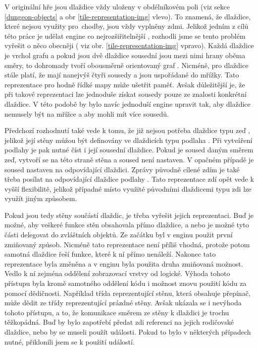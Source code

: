 V originální hře jsou dlaždice vždy uloženy v obdélníkovém poli (viz sekce \ref{dungeon-objects} a obr \ref{tile-representation-img} vlevo).
To znamená, že dlaždice, které nejsou využity pro~chodby, jsou vždy vyplněny zdmi. Jelikož jedním z cílů této práce je udělat engine co 
nejrozšiřitelnější , rozhodli jsme se tento problém vyřešit o něco obecněji ( viz obr. \ref{tile-representation-img} vpravo).
Každá dlaždice je vrchol grafu a pokud 
jsou dvě dlaždice sousední jsou mezi nimi hrany oběma směry, to dohromady tvoří obousměrně orientovaný graf .
Nicméně, pro dlaždice stále platí, že mají nanejvýš čtyři sousedy a jsou uspořádané do mřížky. Tato reprezentace pro hodně řídké mapy může ušetřit paměť.
Avšak důležitější je, že při takové reprezentaci lze jednoduše získat sousedy pouze ze znalosti konkrétní dlaždice. V této 
podobě by bylo navíc jednoduší engine upravit tak, aby dlaždice nemusely být na mřížce a aby mohli mít více sousedů.


Předchozí rozhodnutí také vede k tomu, že již nejsou potřeba dlaždice typu zeď , jelikož její stěny můžou být definovány ve 
dlaždicích typu podlaha . Při vytváření podlahy je pak nutné číst i její sousední dlaždice. Pokud je soused daným směrem zeď, 
vytvoří se na této straně stěna a soused není nastaven. V opačném případě je soused nastaven na odpovídající dlaždici.
Zprávy původně cílené zdím je také třeba posílat na odpovídající dlaždice podlahy . Tato reprezentace zdí opět vede k
vyšší flexibilitě, jelikož případné místo využité původními dlaždicemi typu zdi lze využít jiným způsobem.


Pokud jsou tedy stěny součástí dlaždic, je třeba vyřešit jejich reprezentaci. Buď je možné, aby veškeré funkce stěn obsahovala přímo
dlaždice, a nebo je možné tyto části delegovat do zvláštních objektů. Ze začátku byl v enginu použit první zmiňovaný způsob. Nicméně 
tato reprezentace není příliš vhodná, protože potom samotná dlaždice řeší funkce, které k ní přímo nenáleží.
Nakonec tato reprezentace byla změněna a v enginu byla použita druha zmiňovaná možnost. Vedlo k ní zejména oddělení zobrazovací vrstvy 
od logické. Výhoda tohoto přístupu byla kromě samotného oddělení kódu i možnost znovu použití kódu za pomocí dědičnosti. 
Například třída reprezentující stěnu, která obsahuje přepínač, může dědit ze třídy reprezentující prázdné stěny. 
Avšak ukázala se i nevýhoda tohoto přístupu, a to, že komunikace směrem ze stěny k dlaždici je trochu těžkopádná.
Buď by bylo zapotřebí předat zdi referenci na jejich rodičovské dlaždice, nebo by se museli
použít události. Pokud to bylo v některých případech nutné, přiklonili jsem se k použití událostí.

